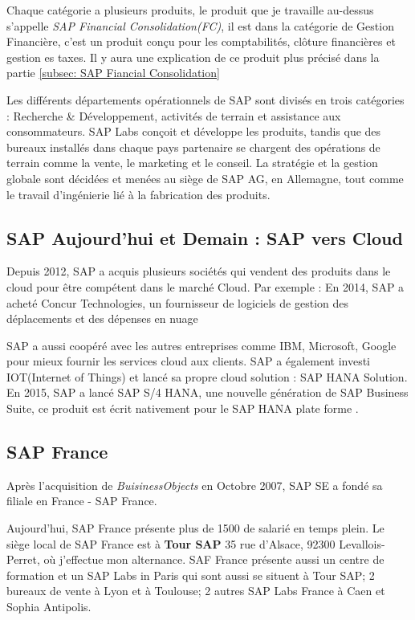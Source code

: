 Chaque catégorie a plusieurs produits, le produit que je travaille au-dessus s'appelle \textit{SAP Financial Consolidation(FC)}, il est dans la catégorie de Gestion Financière, c'est un produit conçu pour les comptabilités, clôture financières et gestion es taxes. Il y aura une explication de ce produit plus précisé dans la partie \ref{subsec: SAP Fiancial Consolidation}


Les différents départements opérationnels de SAP sont divisés en trois catégories : Recherche \& Développement, activités de terrain et assistance aux consommateurs. SAP Labs conçoit et développe les produits, tandis que des bureaux installés dans chaque pays partenaire se chargent des opérations de terrain comme la vente, le marketing et le conseil. La stratégie et la gestion globale sont décidées et menées au siège de SAP AG, en Allemagne, tout comme le travail d’ingénierie lié à la fabrication des produits.

\subsection{SAP Aujourd'hui et Demain : SAP vers Cloud}
Depuis 2012, SAP a acquis plusieurs sociétés qui vendent des produits dans le cloud pour être compétent dans le marché Cloud. Par exemple : En 2014, SAP a acheté Concur Technologies, un fournisseur de logiciels de gestion des déplacements et des dépenses en nuage

\par SAP a aussi coopéré avec les autres entreprises comme IBM, Microsoft, Google pour mieux fournir les services cloud aux clients. SAP a également investi IOT(Internet of Things) et lancé sa propre cloud solution : SAP HANA Solution. En 2015, SAP a lancé SAP S/4 HANA, une nouvelle génération de SAP Business Suite, ce produit est écrit nativement pour le SAP HANA plate forme .

\subsection{SAP France}
    Après l'acquisition de \textit{BuisinessObjects} en Octobre 2007, SAP SE a fondé sa filiale en France - SAP France. 
    \par Aujourd'hui, SAP France présente plus de 1500 de salarié en temps plein. Le siège local de SAP France est à \textbf{Tour SAP} 35 rue d'Alsace, 92300 Levallois-Perret, où j'effectue mon alternance. SAF France présente aussi un centre de formation et un SAP Labs in Paris qui sont aussi se situent à Tour SAP; 2 bureaux de vente à Lyon et à Toulouse; 2 autres SAP Labs France à Caen et Sophia Antipolis.
    
